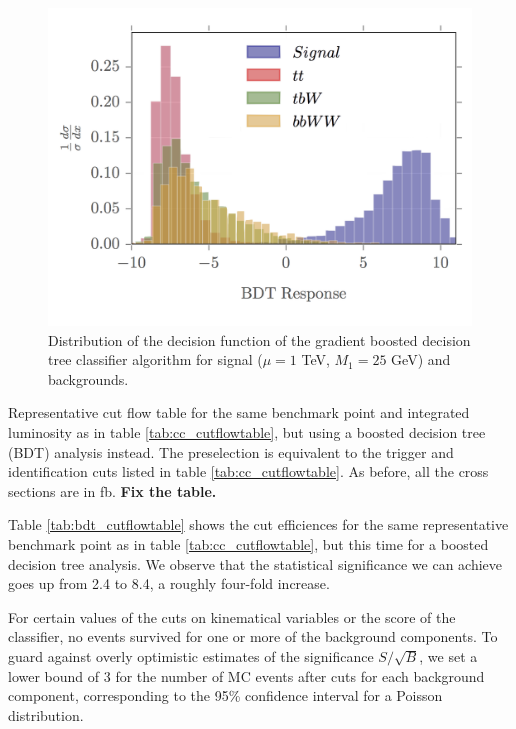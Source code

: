 \documentclass[a4paper,11pt]{article}
\newcommand{\Shufang}[1]{{\bf\color{Maroon}  #1}}
\begin{document}
\begin{figure}[h]
\centering
\includegraphics[trim = {0 0.5cm 0 0},clip]{images/bdt_response_png}
\caption{Distribution of the decision function of the gradient boosted decision
tree classifier algorithm for signal ($\mu = 1$ TeV, $M_1 = 25$ GeV) and
backgrounds. }
\label{fig:bdt_response}
\end{figure}

\begin{table}[h]
  \centering
  
  \caption{Representative cut flow table for the same benchmark point and
    integrated luminosity as in table \ref{tab:cc_cutflowtable}, but using a
    boosted decision tree (BDT) analysis instead. The preselection is equivalent
    to the trigger and identification cuts listed in table
    \ref{tab:cc_cutflowtable}. As before, all the cross sections are in
  fb.  \Shufang{Fix the table.}}
\label{tab:bdt_cutflowtable}
\end{table}

Table \ref{tab:bdt_cutflowtable} shows the cut efficiences for the same
representative benchmark point as in table \ref{tab:cc_cutflowtable}, but this
time for a boosted decision tree analysis. We observe that the statistical
significance we can achieve goes up from 2.4 to 8.4, a roughly four-fold
increase.  

For certain values of the
cuts on kinematical variables or the score of the classifier, no events survived
for one or more of the background components. To guard against overly optimistic
estimates of the significance $S/\sqrt{B}$, we set a lower bound of 3 for the
number of MC events after cuts for each background component, corresponding to
the 95\% confidence interval for a Poisson distribution. 
\end{document}

